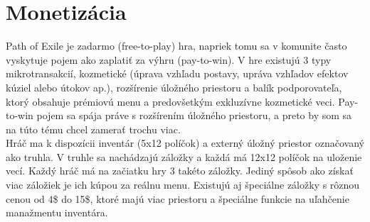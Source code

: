 \documentclass[10pt,oneside,slovak,a4paper]{article}
\begin{document}






\section{Monetizácia}
Path of Exile je zadarmo (free-to-play) hra, napriek tomu sa v komunite často vyskytuje pojem ako zaplatiť za výhru (pay-to-win). V hre existujú 3 typy mikrotransakcií, kozmetické (úprava vzhľadu postavy, upráva vzhľadov efektov kúziel alebo útokov ap.), rozšírenie úložného priestoru a balík podporovateľa, ktorý obsahuje prémiovú menu a predovšetkým exkluzívne kozmetické veci. Pay-to-win pojem sa spája práve s rozšírením úložného priestoru, a preto by som sa na túto tému chcel zamerať trochu viac.\\

Hráč ma k dispozícii inventár (5x12 políčok) a externý úložný priestor označovaný ako truhla. V truhle sa nachádzajú záložky a každá má 12x12 políčok na uloženie vecí. Každý hráč má na začiatku hry 3 takéto záložky. Jediný spôsob ako získať viac záložiek je ich kúpou za reálnu menu. Existujú aj špeciálne záložky s rôznou cenou od 4\$ do 15\$\cite{PoE-shop-stash-tabs}, ktoré majú viac priestoru a špeciálne funkcie na uľahčenie manažmentu inventára.\\
\end{document}
